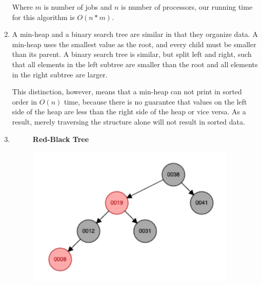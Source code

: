 \documentclass{article}
\begin{document}
\begin{enumerate}
    Where \(m\) is number of jobs and \(n\) is number of processors, our running time for this algorithm is \(O(n*m)\).
\item
    A min-heap and a binary search tree are similar in that they organize data. A min-heap uses the smallest value as the root, and every child must be smaller than its parent. A binary search tree is similar, but split left and right, such that all elements in the left subtree are smaller than the root and all elements in the right subtree are larger. 
    
    This distinction, however, means that a min-heap can not print in sorted order in \(O(n)\) time, because there is no guarantee that values on the left side of the heap are less than the right side of the heap or vice versa. As a result, merely traversing the structure alone will not result in sorted data.
    
\item
\hspace*{.5em}\begin{minipage}{.99\linewidth}
    \begin{figure}[H]
        \centering
        \textbf{Red-Black Tree}\par\medskip
        \centerline{\includegraphics[width=10cm]{redBlackTree.png}}
    \end{figure} 
    \end{minipage}

\end{enumerate}
\end{document}
